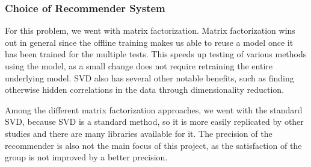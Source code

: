 \subsubsection{Choice of Recommender System}\label{sec:decision} %
For this problem, we went with matrix factorization. Matrix factorization wins out in general since the offline training makes us able to reuse a model once it has been trained for the multiple tests. This speeds up testing of various methods using the model, as a small change does not require retraining the entire underlying model. SVD also has several other notable benefits, such as finding otherwise hidden correlations in the data through dimensionality reduction.

Among the different matrix factorization approaches, we went with the standard SVD, because SVD is a standard method, so it is more easily replicated by other studies and there are many libraries available for it. The precision of the recommender is also not the main focus of this project, as the satisfaction of the group is not improved by a better precision.